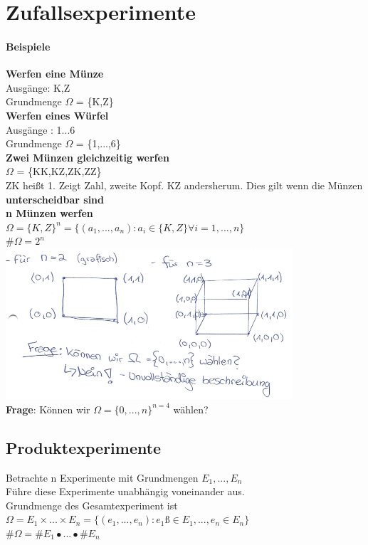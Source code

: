 \chapter{Zufallsexperimente}
\subsubsection{Beispiele}
\textbf{Werfen eine Münze}\\ Ausgänge: K,Z\\
Grundmenge $\Omega$ = \{K,Z\}\medskip\\
\textbf{Werfen eines Würfel}\\
Ausgänge : 1...6\\
Grundmenge $\Omega$ = \{1,...,6\}\medskip\\
\textbf{Zwei Münzen gleichzeitig werfen}\\
$\Omega$ = \{KK,KZ,ZK,ZZ\}\\
ZK heißt 1. Zeigt Zahl, zweite Kopf. KZ andersherum. Dies gilt wenn die Münzen \textbf{unterscheidbar sind}\medskip\\
\textbf{n Münzen werfen}\\
$\Omega = \{K,Z\}^n = \{(a_1,...,a_n):a_i \in \{K,Z\} \forall i = 1,...,n\}$\\
\#$\Omega = 2^n$\\
\includegraphics[width=0.8\textwidth]{img/grafikOmega.PNG}
\medskip\\
\textbf{Frage}: Können wir $\Omega = \{0,...,n\}^{n=4}$ wählen?
\section{Produktexperimente}
Betrachte n Experimente mit Grundmengen $E_1,...,E_n$\\
Führe diese Experimente unabhängig voneinander aus.\medskip\\
Grundmenge des Gesamtexperiment ist \\$\Omega = E_1\times ... \times E_n = \{(e_1,...,e_n):e_1 ß\in E_1,...,e_n\in E_n\}$\\
\#$\Omega = \#E_1 \bullet ... \bullet \#E_n$
